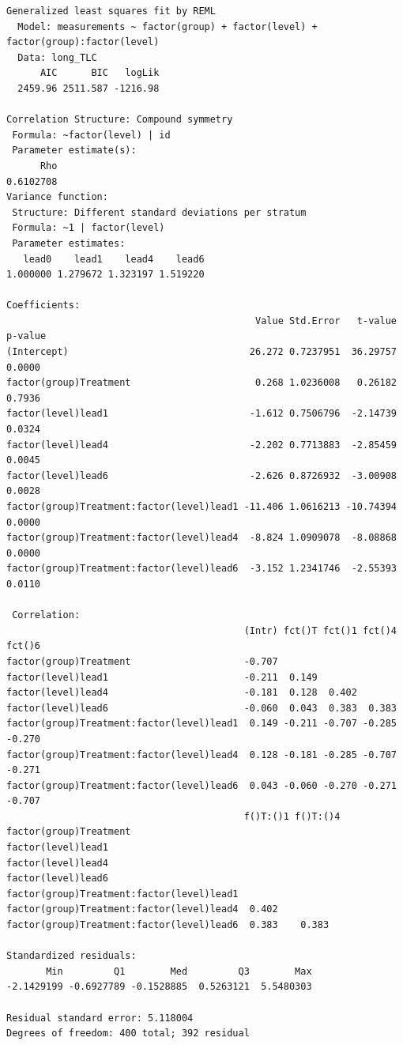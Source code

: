 \documentclass[
  letterpaper,
  DIV=11,
  numbers=noendperiod]{scrreprt}
\begin{document}
\begin{verbatim}
Generalized least squares fit by REML
  Model: measurements ~ factor(group) + factor(level) + factor(group):factor(level) 
  Data: long_TLC 
      AIC      BIC   logLik
  2459.96 2511.587 -1216.98

Correlation Structure: Compound symmetry
 Formula: ~factor(level) | id 
 Parameter estimate(s):
      Rho 
0.6102708 
Variance function:
 Structure: Different standard deviations per stratum
 Formula: ~1 | factor(level) 
 Parameter estimates:
   lead0    lead1    lead4    lead6 
1.000000 1.279672 1.323197 1.519220 

Coefficients:
                                            Value Std.Error   t-value p-value
(Intercept)                                26.272 0.7237951  36.29757  0.0000
factor(group)Treatment                      0.268 1.0236008   0.26182  0.7936
factor(level)lead1                         -1.612 0.7506796  -2.14739  0.0324
factor(level)lead4                         -2.202 0.7713883  -2.85459  0.0045
factor(level)lead6                         -2.626 0.8726932  -3.00908  0.0028
factor(group)Treatment:factor(level)lead1 -11.406 1.0616213 -10.74394  0.0000
factor(group)Treatment:factor(level)lead4  -8.824 1.0909078  -8.08868  0.0000
factor(group)Treatment:factor(level)lead6  -3.152 1.2341746  -2.55393  0.0110

 Correlation: 
                                          (Intr) fct()T fct()1 fct()4 fct()6
factor(group)Treatment                    -0.707                            
factor(level)lead1                        -0.211  0.149                     
factor(level)lead4                        -0.181  0.128  0.402              
factor(level)lead6                        -0.060  0.043  0.383  0.383       
factor(group)Treatment:factor(level)lead1  0.149 -0.211 -0.707 -0.285 -0.270
factor(group)Treatment:factor(level)lead4  0.128 -0.181 -0.285 -0.707 -0.271
factor(group)Treatment:factor(level)lead6  0.043 -0.060 -0.270 -0.271 -0.707
                                          f()T:()1 f()T:()4
factor(group)Treatment                                     
factor(level)lead1                                         
factor(level)lead4                                         
factor(level)lead6                                         
factor(group)Treatment:factor(level)lead1                  
factor(group)Treatment:factor(level)lead4  0.402           
factor(group)Treatment:factor(level)lead6  0.383    0.383  

Standardized residuals:
       Min         Q1        Med         Q3        Max 
-2.1429199 -0.6927789 -0.1528885  0.5263121  5.5480303 

Residual standard error: 5.118004 
Degrees of freedom: 400 total; 392 residual
\end{verbatim}
\end{document}
